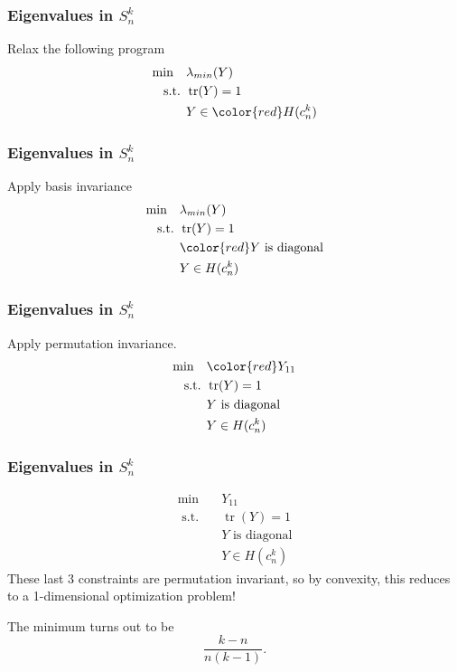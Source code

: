 \documentclass{beamer}
\DeclareMathOperator{\tr}{tr}
\newcommand{\st}{{\text{ s.t. }}}
\begin{document}
\begin{frame}
    \frametitle{Eigenvalues in $S^k_n$}
    Relax the following program
    \begin{equation*}
        \begin{aligned}
            \min\quad & \lambda_{min}(Y)\\
            \st & \tr(Y) = 1\\
                & Y \in {\color{red}H(c_n^k)}\\
        \end{aligned}
    \end{equation*}
\end{frame}
\begin{frame}
    \frametitle{Eigenvalues in $S^k_n$}
    Apply basis invariance
    \begin{equation*}
        \begin{aligned}
            \min\quad & \lambda_{min}(Y)\\
            \st & \tr(Y) = 1\\
                & {\color{red}Y \text{ is diagonal}}\\
                & Y \in H(c_n^k)
        \end{aligned}
    \end{equation*}
\end{frame}
\begin{frame}
    \frametitle{Eigenvalues in $S^k_n$}
    Apply permutation invariance.
    \begin{equation*}
        \begin{aligned}
            \min\quad & {\color{red}Y_{11}}\\
            \st & \tr(Y) = 1\\
                & Y \text{ is diagonal}\\
                & Y \in H(c_n^k)
        \end{aligned}
    \end{equation*}
\end{frame}
\begin{frame}
    \frametitle{Eigenvalues in $S^k_n$}
    \begin{equation*}
        \begin{aligned}
            \min\quad & Y_{11}\\
            \st & \tr(Y) = 1\\
                & Y \text{ is diagonal}\\
                & Y \in H(c_n^k)
        \end{aligned}
    \end{equation*}
    \pause
    These last 3 constraints are permutation invariant, so by convexity, this reduces to a 1-dimensional optimization problem!

    The minimum turns out to be 
    \[
        \frac{k-n}{n(k-1)}.
    \]

\end{frame}
\end{document}
